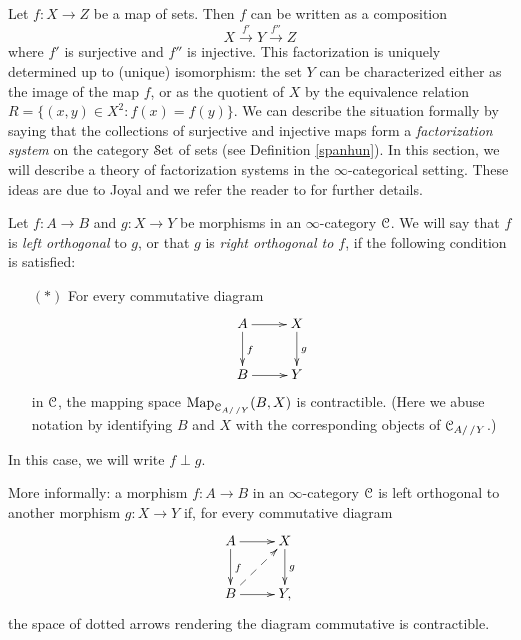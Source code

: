 Let $f: X \rightarrow Z$ be a map of sets. Then $f$ can be written as a composition
$$ X \stackrel{f'}{\rightarrow} Y \stackrel{f''}{\rightarrow} Z$$
where $f'$ is surjective and $f''$ is injective. This factorization is uniquely determined up to (unique) isomorphism: the set $Y$ can be characterized either as the image of the map $f$, or as the quotient
of $X$ by the equivalence relation $R = \{ (x,y) \in X^2: f(x) = f(y) \}$. We can describe the situation formally by saying that the collections of surjective and injective maps form a {\em factorization system} on the category $\operatorname{\mathcal{S}et}$ of sets (see Definition \ref{spanhun}). In this section, we will describe a theory of factorization systems in the $\infty$-categorical setting. These ideas are due to Joyal and we refer the reader to \cite{joyalnotpub} for further details.

\begin{definition}\label{defperp}
Let $f: A \rightarrow B$ and $g: X \rightarrow Y$ be morphisms in an $\infty$-category $\operatorname{\mathcal{C}}$.
We will say that $f$ is {\it left orthogonal} to $g$, or that $g$ is {\it right orthogonal to $f$},
if the following condition is satisfied:
\begin{itemize}
\item[$(\ast)$] For every commutative diagram
$$ \xymatrix{ A \ar[r] \ar[d]^{f} & X \ar[d]^{g} \\
B \ar[r] & Y }$$
in $\operatorname{\mathcal{C}}$, the mapping space $\operatorname{{Map}}_{\operatorname{\mathcal{C}}_{A/ \, /Y}}(B,X )$
is contractible. (Here we abuse notation by identifying $B$ and $X$ with the corresponding objects
of $\operatorname{\mathcal{C}}_{A/\,/Y}$.)
\end{itemize}
In this case, we will write $f \perp g$.
\end{definition}

\begin{remark}
More informally: a morphism $f: A \rightarrow B$ in an $\infty$-category $\operatorname{\mathcal{C}}$ is left orthogonal to another morphism $g: X \rightarrow Y$ if, for every commutative diagram
$$ \xymatrix{ A \ar[d]^{f} \ar[r] & X \ar[d]^{g} \\
B \ar[r] \ar@{-->}[ur] & Y, }$$
the space of dotted arrows rendering the diagram commutative is contractible.
\end{remark}

